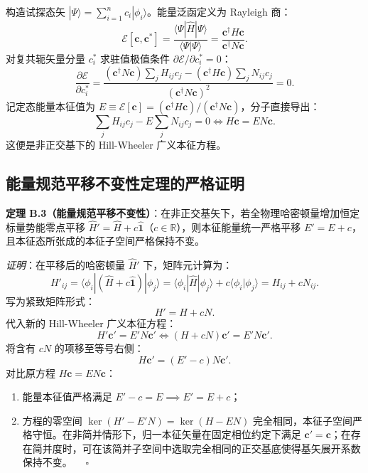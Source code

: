 构造试探态矢 $|\Psi\rangle = \sum_{i=1}^n c_i |\phi_i\rangle$。能量泛函定义为 Rayleigh 商：
\begin{equation}\label{eq:appB-energy-functional}
\mathcal{E}[\mathbf{c}, \mathbf{c}^*] = \frac{\langle \Psi | \hat{H} | \Psi \rangle}{\langle \Psi | \Psi \rangle} = \frac{\mathbf{c}^\dagger H \mathbf{c}}{\mathbf{c}^\dagger N \mathbf{c}}.
\end{equation}
对复共轭矢量分量 $c_i^*$ 求驻值极值条件 $\partial \mathcal{E} / \partial c_i^* = 0$：
\begin{equation}
\frac{\partial \mathcal{E}}{\partial c_i^*} = \frac{(\mathbf{c}^\dagger N \mathbf{c}) \sum_j H_{ij} c_j - (\mathbf{c}^\dagger H \mathbf{c}) \sum_j N_{ij} c_j}{(\mathbf{c}^\dagger N \mathbf{c})^2} = 0.
\end{equation}
记定态能量本征值为 $E \equiv \mathcal{E}[\mathbf{c}] = (\mathbf{c}^\dagger H \mathbf{c}) / (\mathbf{c}^\dagger N \mathbf{c})$，分子直接导出：
\begin{equation}\label{eq:appB-HW-derivation}
\sum_j H_{ij} c_j - E \sum_j N_{ij} c_j = 0 \iff H \mathbf{c} = E N \mathbf{c}.
\end{equation}
这便是非正交基下的 Hill-Wheeler 广义本征方程。

\subsection{能量规范平移不变性定理的严格证明}

\textbf{定理 B.3（能量规范平移不变性）}：在非正交基矢下，若全物理哈密顿量增加恒定标量势能零点平移 $\hat{H}' = \hat{H} + c \hat{\mathbf{1}}$（$c \in \mathbb{R}$），则本征能量统一严格平移 $E' = E + c$，且本征态所张成的本征子空间严格保持不变。

\textit{证明}：在平移后的哈密顿量 $\hat{H}'$ 下，矩阵元计算为：
\begin{equation}
H'_{ij} = \langle \phi_i | (\hat{H} + c \hat{\mathbf{1}}) | \phi_j \rangle = \langle \phi_i | \hat{H} | \phi_j \rangle + c \langle \phi_i | \phi_j \rangle = H_{ij} + c N_{ij}.
\end{equation}
写为紧致矩阵形式：
\begin{equation}\label{eq:appB-H-matrix-shift}
H' = H + c N.
\end{equation}
代入新的 Hill-Wheeler 广义本征方程：
\begin{equation}
H' \mathbf{c}' = E' N \mathbf{c}' \iff (H + c N) \mathbf{c}' = E' N \mathbf{c}'.
\end{equation}
将含有 $c N$ 的项移至等号右侧：
\begin{equation}
H \mathbf{c}' = (E' - c) N \mathbf{c}'.
\end{equation}
对比原方程 $H \mathbf{c} = E N \mathbf{c}$：
\begin{enumerate}
\item 能量本征值严格满足 $E' - c = E \implies E' = E + c$；
\item 方程的零空间 $\ker(H' - E' N) = \ker(H - E N)$ 完全相同，本征子空间严格守恒。在非简并情形下，归一本征矢量在固定相位约定下满足 $\mathbf{c}' = \mathbf{c}$；在存在简并度时，可在该简并子空间中选取完全相同的正交基底使得基矢展开系数保持不变。 $\quad \square$
\end{enumerate}

